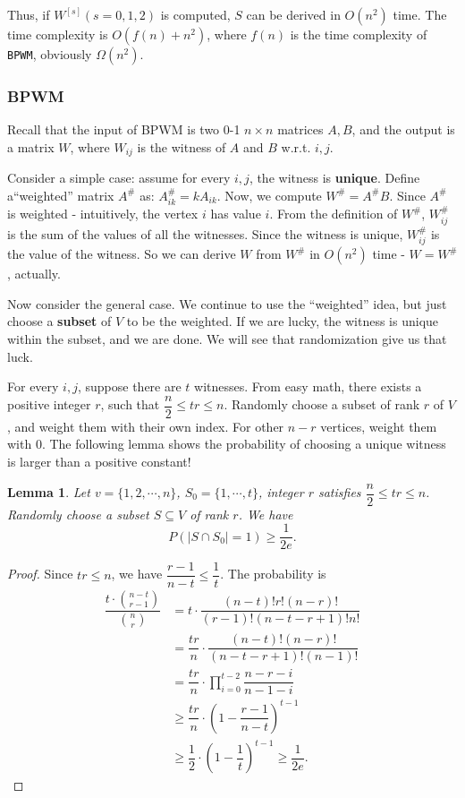 \documentclass[12pt]{article}
\newtheorem{lemma}{Lemma}
\begin{document}
Thus, if $W^{[s]}(s=0,1,2)$ is computed, $S$ can be derived in $O(n^2)$ time. The time complexity is $O(f(n)+n^2)$, where $f(n)$ is the time complexity of \texttt{BPWM}, obviously $\Omega(n^2)$.

\subsubsection{BPWM}
\label{sec:bpwm}

Recall that the input of BPWM is two 0-1 $n\times n$ matrices $A,B$, and the output is a matrix $W$, where $W_{ij}$ is the witness of $A$ and $B$ w.r.t. $i,j$.

Consider a simple case: assume for every $i,j$, the witness is \textbf{unique}. Define a``weighted'' matrix $A^{\#}$ as: $A^{\#}_{ik}=kA_{ik}$. Now, we compute $W^{\#}=A^{\#}B$. Since $A^{\#}$ is weighted - intuitively, the vertex $i$ has value $i$. From the definition of $W^{\#}$, $W^{\#}_{ij}$ is the sum of the values of all the witnesses. Since the witness is unique, $W^{\#}_{ij}$ is the value of the witness. So we can derive $W$ from $W^{\#}$ in $O(n^2)$ time - $W=W^{\#}$, actually.

Now consider the general case. We continue to use the ``weighted'' idea, but just choose a \textbf{subset} of $V$ to be the weighted. If we are lucky, the witness is unique within the subset, and we are done. We will see that randomization give us that luck.

For every $i,j$, suppose there are $t$ witnesses. From easy math, there exists a positive integer $r$, such that $\dfrac{n}{2}\le tr\le n$. Randomly choose a subset of rank $r$ of $V$, and weight them with their own index. For other $n-r$ vertices, weight them with $0$. The following lemma shows the probability of choosing a unique witness is larger than a positive constant!

\begin{lemma}
\label{6}
Let $v=\{1,2,\cdots,n\}$, $S_0=\{1,\cdots,t\}$, integer $r$ satisfies $\dfrac{n}{2}\le tr\le n$. Randomly choose a subset $S\subseteq V$ of rank $r$. We have
$$P(|S\cap S_0|=1)\ge \dfrac{1}{2e}.$$
\end{lemma}
\begin{proof}
Since $tr\le n$, we have $\dfrac{r-1}{n-t}\le \dfrac{1}{t}$. The probability is
\begin{align*}
\dfrac{t\cdot \binom{n-t}{r-1}}{\binom{n}{r}} &= t\cdot \dfrac{(n-t)!r!(n-r)!}{(r-1)!(n-t-r+1)!n!}\\
&= \dfrac{tr}{n}\cdot \dfrac{(n-t)!(n-r)!}{(n-t-r+1)!(n-1)!}\\
&= \dfrac{tr}{n}\cdot \prod\limits_{i=0}^{t-2} \dfrac{n-r-i}{n-1-i}\\
&\ge \dfrac{tr}{n}\cdot \left(1-\dfrac{r-1}{n-t}\right)^{t-1}\\
&\ge \dfrac{1}{2}\cdot \left(1-\dfrac{1}{t}\right)^{t-1} \ge \dfrac{1}{2e}.
\end{align*}
\end{proof}
\end{document}
